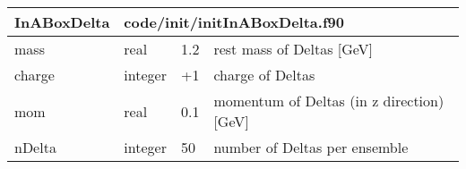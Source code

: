 \documentclass{article}
\begin{document}
\begin{longtable}{llll}
\toprule
\textbf{\large{InABoxDelta}} & \multicolumn{3}{l}{\footnotesize{code/init/initInABoxDelta.f90}}\\*
\midrule
\endfirsthead
\midrule
\endhead
mass & \begin{minipage}[t]{2cm}real\end{minipage} & \begin{minipage}[t]{2cm}1.2\end{minipage} & \begin{minipage}[t]{12cm}rest mass of Deltas [GeV]\end{minipage}\\*
\midrule
charge & \begin{minipage}[t]{2cm}integer\end{minipage} & \begin{minipage}[t]{2cm}+1\end{minipage} & \begin{minipage}[t]{12cm}charge of Deltas\end{minipage}\\*
\midrule
mom & \begin{minipage}[t]{2cm}real\end{minipage} & \begin{minipage}[t]{2cm}0.1\end{minipage} & \begin{minipage}[t]{12cm}momentum of Deltas (in z direction) [GeV]\end{minipage}\\*
\midrule
nDelta & \begin{minipage}[t]{2cm}integer\end{minipage} & \begin{minipage}[t]{2cm}50\end{minipage} & \begin{minipage}[t]{12cm}number of Deltas per ensemble\end{minipage}\\*
\bottomrule
\end{longtable}
{ }



\end{document}
